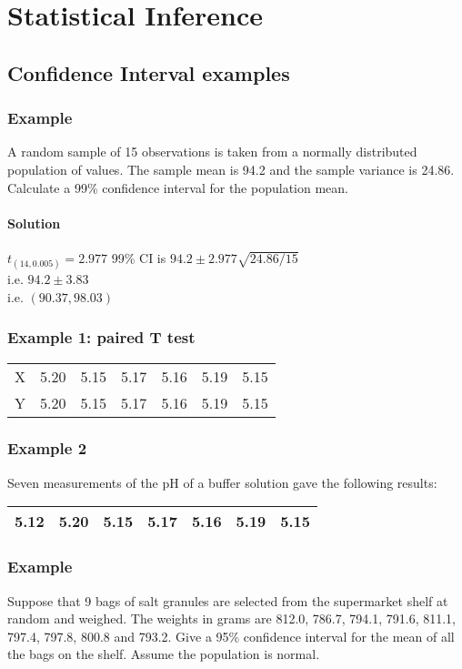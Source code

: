 \chapter{Statistical Inference}

\section{Confidence Interval examples}

\subsection{Example}
A random sample of 15 observations is taken from a normally distributed population
of values. The sample mean is 94.2 and the sample variance is 24.86.
Calculate a 99\% confidence interval for the population mean.


\subsubsection{Solution}
$t_(14,0.005) = 2.977$
99\% CI is $94.2 \pm 2.977 \sqrt{24.86/15}$ \\i.e. $94.2 \pm 3.83$ \\i.e. $(90.37,98.03)$


\subsection{Example 1: paired T test}


\begin{tabular}{|c|c|c|c|c|c|c|}
  \hline
X & 5.20 & 5.15 & 5.17 & 5.16 & 5.19 & 5.15\\
Y & 5.20 & 5.15 & 5.17 & 5.16 & 5.19 & 5.15\\
  \hline
\end{tabular}


\subsection{Example 2}

Seven measurements of the pH of a buffer solution gave the
following results:

\begin{tabular}{|c|c|c|c|c|c|c|}
  \hline
5.12 & 5.20 & 5.15 & 5.17 & 5.16 & 5.19 & 5.15\\
  \hline
\end{tabular}



\subsection{Example}
Suppose that 9 bags of salt granules are selected from the supermarket
shelf at random and weighed. The weights in grams are 812.0, 786.7, 794.1,
791.6, 811.1, 797.4, 797.8, 800.8 and 793.2. Give a 95\% confidence interval for the
mean of all the bags on the shelf. Assume the population is normal.


